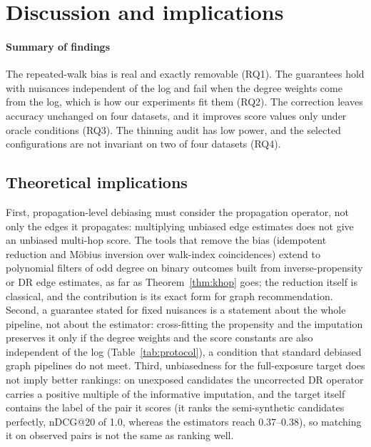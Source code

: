 \documentclass[preprint,review,12pt,authoryear]{elsarticle}
\theoremstyle{definition}
\begin{document}
\section{Discussion and implications}\label{sec:disc}

\paragraph{Summary of findings} The repeated-walk bias is real and exactly removable
(RQ1). The guarantees hold with nuisances independent of the log and fail when the
degree weights come from the log, which is how our experiments fit them (RQ2). The
correction leaves accuracy unchanged on four datasets, and it improves score values
only under oracle conditions (RQ3). The thinning audit has low power, and the selected
configurations are not invariant on two of four datasets (RQ4).

\subsection{Theoretical implications}
First, propagation-level debiasing must consider the propagation operator, not only the
edges it propagates: multiplying unbiased edge estimates does not give an unbiased
multi-hop score. The tools that remove the bias (idempotent reduction and Möbius
inversion over walk-index coincidences) extend to polynomial filters of odd degree on
binary outcomes built from inverse-propensity or DR edge estimates, as far as
Theorem~\ref{thm:khop} goes; the reduction itself is classical, and the contribution is
its exact form for graph recommendation. Second, a guarantee stated for fixed nuisances
is a statement about the whole pipeline, not about the estimator: cross-fitting the
propensity and the imputation preserves it only if the degree weights and the score
constants are also independent of the log (Table~\ref{tab:protocol}), a condition that
standard debiased graph pipelines do not meet. Third, unbiasedness for the
full-exposure target does not imply better rankings: on unexposed candidates the
uncorrected DR operator carries a positive multiple of the informative imputation, and the
target itself contains the label of the pair it scores (it ranks the semi-synthetic
candidates perfectly, nDCG@20 of 1.0, whereas the estimators reach 0.37--0.38), so
matching it on observed pairs is not the same as ranking well.
\end{document}
